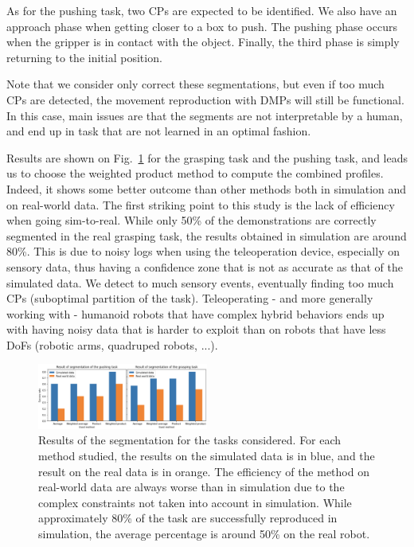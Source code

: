 \documentclass[conference]{IEEEtran}
\begin{document}
As for the pushing task, two CPs are expected to be identified. We also have an approach phase when getting closer to a box to push. The pushing phase occurs when the gripper is in contact with the object. Finally, the third phase is simply returning to the initial position.

Note that we consider only correct these segmentations, but even if too much CPs are detected, the movement reproduction with DMPs will still be functional. In this case, main issues are that the segments are not interpretable by a human, and end up in task that are not learned in an optimal fashion.


Results are shown on Fig.~\ref{fig:resultsSeg} for the grasping task and the pushing task, and leads us to choose the weighted product method to compute the combined profiles. Indeed, it shows some better outcome than other methods both in simulation and on real-world data. The first striking point to this study is the lack of efficiency when going sim-to-real. While only 50\% of the demonstrations are correctly segmented in the real grasping task, the results obtained in simulation are around 80\%. This is due to noisy logs when using the teleoperation device, especially on sensory data, thus having a confidence zone that is not as accurate as that of the simulated data. We detect to much sensory events, eventually finding too much CPs (suboptimal partition of the task). Teleoperating - and more generally working with - humanoid robots that have complex hybrid behaviors ends up with having noisy data that is harder to exploit than on robots that have less DoFs (robotic arms, quadruped robots, ...).

\begin{figure}[t]
  \centering
  \includegraphics[width=0.5\textwidth]{img/results_segmentation.png}
  \caption{Results of the segmentation for the tasks considered. For each method studied, the results on the simulated data is in blue, and the result on the real data is in orange. The efficiency of the method on real-world data are always worse than in simulation due to the complex constraints not taken into account in simulation. While approximately 80\% of the task are successfully reproduced in simulation, the average percentage is around 50\% on the real robot.}
  \label{fig:resultsSeg}
\end{figure}
\end{document}
